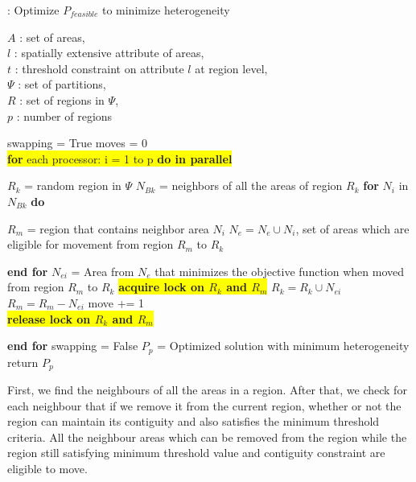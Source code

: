 \documentclass[conference]{IEEEtran}
\begin{document}
\begin{algorithm}
\renewcommand{\thealgorithm}{}
\scriptsize
\caption{: Optimize $P_{feasible}$ to minimize heterogeneity~\cite{r1}}
$A$ : set of areas,\\
$l$ : spatially extensive attribute of areas,\\
$t$ : threshold constraint on attribute $l$ at region level,\\
$\Psi$ : set of partitions,\\
$R$ : set of regions in $\Psi$,\\
$p$ : number of regions
\begin{algorithmic}
\STATE swapping = True
	\STATE moves = 0\\
	\vbox{\colorbox{yellow}{\vbox{\STATE \textbf{for} each processor: i = 1 to p \textbf{do in parallel}}}}
	\begin{ALC@g}	
		\STATE $R_k$ = random region in $\Psi$
		\STATE $N_{Bk}$ = neighbors of all the areas of region $R_k$
		\STATE \textbf{for} $N_i$ in $N_{Bk}$ \textbf{do}
		\begin{ALC@g}
			\STATE $R_m$ = region that contains neighbor area $N_i$
				\STATE $N_e = N_e \cup N_i$, set of areas which are eligible for movement from region $R_m$ to $R_k$
			\ENDIF
		\end{ALC@g}
		\STATE \textbf{end for}
			\STATE $N_{ei}$ = Area from $N_e$ that minimizes the objective function when moved from region $R_m$ to $R_k$
					\vbox{\colorbox{yellow}{\vbox{\STATE \textbf{acquire lock on $R_k$ and $R_m$}}}}
				\STATE $R_k = R_k \cup N_{ei}$
				\STATE $R_m = R_m - N_{ei}$
				\STATE move += 1\\
				\vbox{\colorbox{yellow}{\vbox{\STATE \textbf{release lock on $R_k$ and $R_m$}}}}
			\ENDIF
		\ENDIF
	 \end{ALC@g}
	 \STATE \textbf{end for}
	 	\STATE swapping = False
	 \ENDIF
\ENDWHILE
\STATE $P_p$ = Optimized solution with minimum heterogeneity
\STATE return $P_p$
\end{algorithmic}
\end{algorithm}

First, we find the neighbours of all the areas in a region.  After that, we check for each neighbour that if we remove it from the current region, whether or not the region can maintain its contiguity and also satisfies the minimum threshold criteria. All the neighbour areas which can be removed from the region while the region still satisfying minimum threshold value and contiguity constraint are eligible to move.\\
\end{document}

